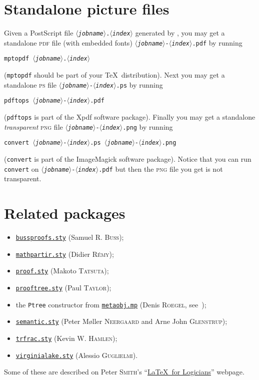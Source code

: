 \documentclass[twoside,11pt]{article}
\newcommand{\param}[1]{\textrm{\textit{$\langle$#1\/$\rangle$}}}
\begin{document}
\section{Standalone picture files\label{sec-standalone}}
%
%
Given a PostScript file \texttt{\param{jobname}.\param{index}} generated by
\MP, you may get a standalone \textsc{pdf} file (with embedded fonts)
\texttt{\param{jobname}-\param{index}.pdf} by running
\begin{center}
\texttt{mptopdf \param{jobname}.\param{index}}
\end{center}
(\texttt{mptopdf} should be part of your \TeX\ distribution). Next you may
get a standalone \textsc{ps} file \texttt{\param{jobname}-\param{index}.ps} by
running
\begin{center}
\texttt{pdftops \param{jobname}-\param{index}.pdf}
\end{center}
(\texttt{pdftops} is part of the Xpdf software package). Finally you may get a
standalone \emph{transparent} \textsc{png} file
\texttt{\param{jobname}-\param{index}.png} by running
\begin{center}
\texttt{convert \param{jobname}-\param{index}.ps
\param{jobname}-\param{index}.png}
\end{center}
(\texttt{convert} is part of the ImageMagick software package). Notice that you
can run \texttt{convert} on \texttt{\param{jobname}-\param{index}.pdf} but then
the \textsc{png} file you get is not transparent.
%
%
\section{Related packages\label{sec-related}}
%
%
\begin{itemize}
\item
\href{http://math.ucsd.edu/~sbuss/ResearchWeb/bussproofs/}
{\texttt{bussproofs.sty}}
(Samuel R. \textsc{Buss});
\item
\href{http://cristal.inria.fr/~remy/latex/}
{\texttt{mathpartir.sty}}
(Didier \textsc{R\'emy});
\item
\href{http://research.nii.ac.jp/~tatsuta/proof-sty.html}
{\texttt{proof.sty}}
(Makoto \textsc{Tatsuta});
\item
\href{http://www.paultaylor.eu/proofs/index.html}
{\texttt{prooftree.sty}}
(Paul \textsc{Taylor});
\item
the \texttt{Ptree} constructor from
\href{http://tug.ctan.org/tex-archive/graphics/%
metapost/contrib/macros/metaobj/}{\texttt{metaobj.mp}}
(Denis \textsc{Roegel}, see~\cite{roegel02});
\item
\href{http://tug.ctan.org/tex-archive/macros/latex/contrib/semantic/}
{\texttt{semantic.sty}}
(Peter M\o ller \textsc{Neergaard} and Arne John \textsc{Glenstrup});
\item
\href{http://www.utdallas.edu/~hamlen/projects.html}
{\texttt{trfrac.sty}}
(Kevin W. \textsc{Hamlen});
\item
\href{http://alessio.guglielmi.name/res/vl/}
{\texttt{virginialake.sty}}
(Alessio \textsc{Guglielmi}).
\end{itemize}
Some of these are described on Peter \textsc{Smith}'s
``\href{http://www.logicmatters.net/latex-for-logicians/}
{\LaTeX\ for Logicians}'' webpage.
\end{document}
